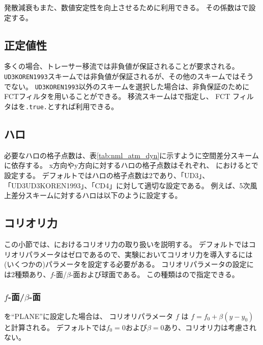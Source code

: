 発散減衰もまた、数値安定性を向上させるために利用できる。
その係数はで設定する。

\subsection{正定値性}

多くの場合、トレーサー移流では非負値が保証されることが要求される。
\verb|UD3KOREN1993|スキームでは非負値が保証されるが、その他のスキームではそうでない。
\verb|UD3KOREN1993|以外のスキームを選択した場合は、非負保証のためにFCTフィルタを用いることができる。
移流スキームはで指定し、
FCT フィルタはを\verb|.true.|とすれば利用できる。

\subsection{ハロ}

必要なハロの格子点数は、表\ref{tab:nml_atm_dyn}に示すように空間差分スキームに依存する。
x方向やy方向に対するハロの格子点数はそれぞれ、
におけるとで設定する。
デフォルトではハロの格子点数は2であり、「UD3」、「UD3UD3KOREN1993」、「CD4」に対して適切な設定である。
例えば、5次風上差分スキームに対するハロは以下のように設定する。


\subsection{コリオリ力} \label{subsec:coriolis}

この小節では、{\scalerm}におけるコリオリ力の取り扱いを説明する。
デフォルトではコリオリパラメータはゼロであるので、実験においてコリオリ力を導入するには
(いくつかの)パラメータを設定する必要がある。
コリオリパラメータの設定には2種類あり、$f$-面/$\beta$-面および球面である。
この種類はので指定できる。

\subsubsection{$f$-面/$\beta$-面}
を``PLANE''に設定した場合は、
コリオリパラメータ $f$ は $f=f_0 + \beta (y-y_0)$と計算される。
デフォルトでは$f_0=0$および$\beta=0$あり、コリオリ力は考慮されない。

